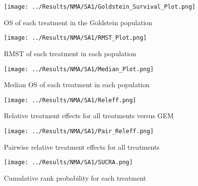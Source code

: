 \begin{figure}[h]
    \centering
    \texttt{[image: ../Results/NMA/SA1/Goldstein\_Survival\_Plot.png]}
    \caption{OS of each treatment in the Goldstein population}
    \label{fig:pred_surv_goldstein_SA1}
\end{figure}

\begin{figure}[h]
    \centering
    \texttt{[image: ../Results/NMA/SA1/RMST\_Plot.png]}
    \caption{RMST of each treatment in each population}
    \label{fig:pred_rmst_SA1}
\end{figure}

\begin{figure}[h]
    \centering
    \texttt{[image: ../Results/NMA/SA1/Median\_Plot.png]}
    \caption{Median OS of each treatment in each population}
    \label{fig:pred_median_SA1}
\end{figure}

\begin{figure}[h]
    \centering
    \texttt{[image: ../Results/NMA/SA1/Releff.png]}
    \caption{Relative treatment effects for all treatments versus GEM}
    \label{fig:releff_SA1}
\end{figure}

\begin{figure}[h]
    \centering
    \texttt{[image: ../Results/NMA/SA1/Pair\_Releff.png]}
    \caption{Pairwise relative treatment effects for all treatments}
    \label{fig:pair_releff_SA1}
\end{figure}

\begin{figure}[h]
    \centering
    \texttt{[image: ../Results/NMA/SA1/SUCRA.png]}
    \caption{Cumulative rank probability for each treatment}
    \label{fig:sucra_SA1}
\end{figure}

\clearpage
